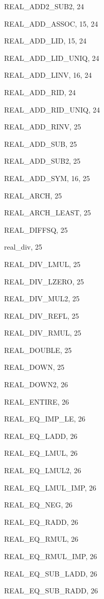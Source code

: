 \begin{theindex}
  \item {\ptt REAL\_ADD2\_SUB2}, 24
  \item {\ptt REAL\_ADD\_ASSOC}, 15, 24
  \item {\ptt REAL\_ADD\_LID}, 15, 24
  \item {\ptt REAL\_ADD\_LID\_UNIQ}, 24
  \item {\ptt REAL\_ADD\_LINV}, 16, 24
  \item {\ptt REAL\_ADD\_RID}, 24
  \item {\ptt REAL\_ADD\_RID\_UNIQ}, 24
  \item {\ptt REAL\_ADD\_RINV}, 25
  \item {\ptt REAL\_ADD\_SUB}, 25
  \item {\ptt REAL\_ADD\_SUB2}, 25
  \item {\ptt REAL\_ADD\_SYM}, 16, 25
  \item {\ptt REAL\_ARCH}, 25
  \item {\ptt REAL\_ARCH\_LEAST}, 25
  \item {\ptt REAL\_DIFFSQ}, 25
  \item {\ptt real\_div}, 25
  \item {\ptt REAL\_DIV\_LMUL}, 25
  \item {\ptt REAL\_DIV\_LZERO}, 25
  \item {\ptt REAL\_DIV\_MUL2}, 25
  \item {\ptt REAL\_DIV\_REFL}, 25
  \item {\ptt REAL\_DIV\_RMUL}, 25
  \item {\ptt REAL\_DOUBLE}, 25
  \item {\ptt REAL\_DOWN}, 25
  \item {\ptt REAL\_DOWN2}, 26
  \item {\ptt REAL\_ENTIRE}, 26
  \item {\ptt REAL\_EQ\_IMP\_LE}, 26
  \item {\ptt REAL\_EQ\_LADD}, 26
  \item {\ptt REAL\_EQ\_LMUL}, 26
  \item {\ptt REAL\_EQ\_LMUL2}, 26
  \item {\ptt REAL\_EQ\_LMUL\_IMP}, 26
  \item {\ptt REAL\_EQ\_NEG}, 26
  \item {\ptt REAL\_EQ\_RADD}, 26
  \item {\ptt REAL\_EQ\_RMUL}, 26
  \item {\ptt REAL\_EQ\_RMUL\_IMP}, 26
  \item {\ptt REAL\_EQ\_SUB\_LADD}, 26
  \item {\ptt REAL\_EQ\_SUB\_RADD}, 26

\end{theindex}
